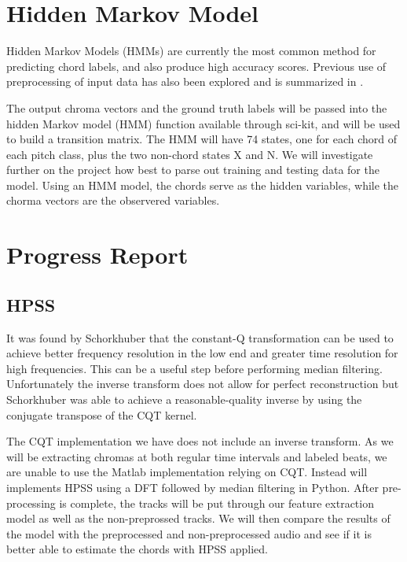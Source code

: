 \documentclass{article}
\begin{document}
\section{Hidden Markov Model}

Hidden Markov Models (HMMs) are currently the most common method for predicting
chord labels, and also produce high accuracy scores. Previous use of
preprocessing of input data has also been explored and is summarized in
\cite{McVicar:00}.

The output chroma vectors and the ground truth labels will be passed into the
hidden Markov model (HMM) function available through sci-kit, and will be used
to build a transition matrix. The HMM will have 74 states, one for each chord
of each pitch class, plus the two non-chord states X and N. We will investigate
further on the project how best to parse out training and testing data for the
model. Using an HMM model, the chords serve as the hidden variables, while the chorma vectors are the observered variables. 

\section{Progress Report}\label{sec:progreport}

\subsection{HPSS}
It was found by Schorkhuber \cite{Schorkhuber:21} that the constant-Q
transformation can be used to achieve better frequency resolution in the low
end and greater time resolution for high frequencies. This can be a useful step
before performing median filtering. Unfortunately the inverse transform does
not allow for perfect reconstruction but Schorkhuber was able to achieve a
reasonable-quality inverse by using the conjugate transpose of the CQT kernel.

The CQT implementation we have does not include an inverse transform. As we
will be extracting chromas at both regular time intervals and labeled beats, we
are unable to use the Matlab implementation relying on CQT.  Instead will
implements HPSS using a DFT followed by median filtering in Python. After
pre-processing is complete, the tracks will be put through our feature
extraction model as well as the non-preprossed tracks. We will then compare the
results of the model with the preprocessed and non-preprocessed audio and see if
it is better able to estimate the chords with HPSS applied.
\end{document}
